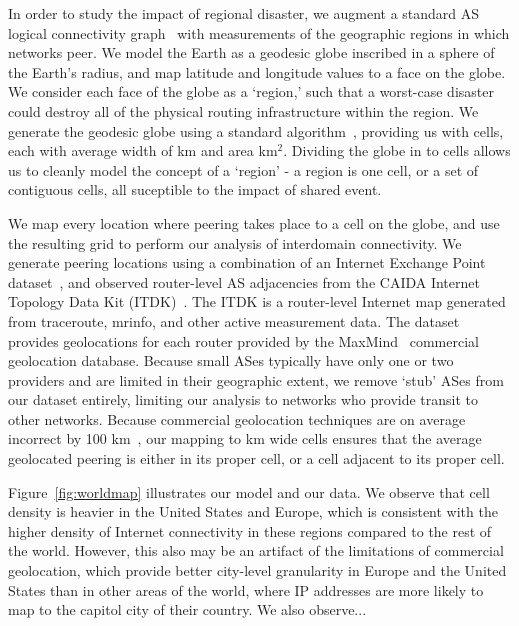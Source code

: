     In order to study the impact of regional disaster, we augment a standard AS logical connectivity graph~\cite{caida-asgraph} with measurements of the geographic regions in which networks peer.
    We model the Earth as a geodesic globe inscribed in a sphere of the Earth's radius, and map latitude and longitude values to a face on the globe.
    We consider each face of the globe as a `region,' such that a worst-case disaster could destroy all of the physical routing infrastructure within the region.
    We generate the geodesic globe using a standard algorithm~\cite{geodesic}, providing us with   cells, each with average width of km and area  km$^2$.  
    Dividing the globe in to cells allows us to cleanly model the concept of a `region' - a region is one cell, or a set of contiguous cells, all suceptible to the impact of shared event. 
     
    We map every location where peering takes place to a cell on the globe, and use the resulting grid to perform our analysis of interdomain connectivity.
    We generate peering locations using a combination of an Internet Exchange Point dataset~\cite{ixps-mapped}, and observed router-level AS adjacencies from the CAIDA Internet Topology Data Kit (ITDK)~\cite{itdk}.
    The ITDK is a router-level Internet map generated from traceroute, mrinfo, and other active measurement data.
    The dataset provides geolocations for each router provided by the MaxMind~\cite{maxmind} commercial geolocation database.
    Because small ASes typically have only one or two providers and are limited in their geographic extent, we remove `stub' ASes from our dataset entirely, limiting our analysis to networks who provide transit to other networks.
    Because commercial geolocation techniques are on average incorrect by 100 km~\cite{someone}, our mapping to  km wide cells ensures that the average geolocated peering is either in its proper cell, or a cell adjacent to its proper cell.
    
    
    Figure~\ref{fig:worldmap} illustrates our model and our data.
    We observe that cell density is heavier in the United States and Europe, which is consistent with the higher density of Internet connectivity in these regions compared to the rest of the world.
    However, this also may be an artifact of the limitations of commercial geolocation, which provide better city-level granularity in Europe and the United States than in other areas of the world, where IP addresses are more likely to map to the capitol city of their country.
    We also observe... 

